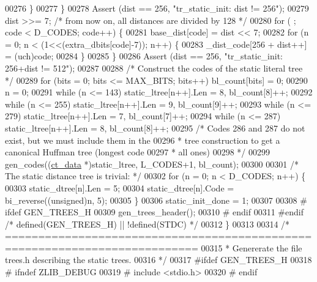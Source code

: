 \begin{DoxyCode}
{{00276         \}
00277     \}
00278     Assert (dist == 256, \textcolor{stringliteral}{"tr\_static\_init: dist != 256"});
00279     dist >>= 7; \textcolor{comment}{/* from now on, all distances are divided by 128 */}
00280     \textcolor{keywordflow}{for} ( ; code < D\_CODES; code++) \{
00281         base\_dist[code] = dist << 7;
00282         \textcolor{keywordflow}{for} (n = 0; n < (1<<(extra\_dbits[code]-7)); n++) \{
00283             \_dist\_code[256 + dist++] = (uch)code;
00284         \}
00285     \}
00286     Assert (dist == 256, \textcolor{stringliteral}{"tr\_static\_init: 256+dist != 512"});
00287 
00288     \textcolor{comment}{/* Construct the codes of the static literal tree */}
00289     \textcolor{keywordflow}{for} (bits = 0; bits <= MAX\_BITS; bits++) bl\_count[bits] = 0;
00290     n = 0;
00291     \textcolor{keywordflow}{while} (n <= 143) static\_ltree[n++].Len = 8, bl\_count[8]++;
00292     \textcolor{keywordflow}{while} (n <= 255) static\_ltree[n++].Len = 9, bl\_count[9]++;
00293     \textcolor{keywordflow}{while} (n <= 279) static\_ltree[n++].Len = 7, bl\_count[7]++;
00294     \textcolor{keywordflow}{while} (n <= 287) static\_ltree[n++].Len = 8, bl\_count[8]++;
00295     \textcolor{comment}{/* Codes 286 and 287 do not exist, but we must include them in the}
00296 \textcolor{comment}{     * tree construction to get a canonical Huffman tree (longest code}
00297 \textcolor{comment}{     * all ones)}
00298 \textcolor{comment}{     */}
00299     gen\_codes((\hyperlink{structct__data__s}{ct\_data} *)static\_ltree, L\_CODES+1, bl\_count);
00300 
00301     \textcolor{comment}{/* The static distance tree is trivial: */}
00302     \textcolor{keywordflow}{for} (n = 0; n < D\_CODES; n++) \{
00303         static\_dtree[n].Len = 5;
00304         static\_dtree[n].Code = bi\_reverse((\textcolor{keywordtype}{unsigned})n, 5);
00305     \}
00306     static\_init\_done = 1;
00307 
00308 \textcolor{preprocessor}{#  ifdef GEN\_TREES\_H}
00309     gen\_trees\_header();
00310 \textcolor{preprocessor}{#  endif}
00311 \textcolor{preprocessor}{#endif }\textcolor{comment}{/* defined(GEN\_TREES\_H) || !defined(STDC) */}\textcolor{preprocessor}{}
00312 \}
00313 
00314 \textcolor{comment}{/* ===========================================================================}
00315 \textcolor{comment}{ * Genererate the file trees.h describing the static trees.}
00316 \textcolor{comment}{ */}
00317 \textcolor{preprocessor}{#ifdef GEN\_TREES\_H}
00318 \textcolor{preprocessor}{#  ifndef ZLIB\_DEBUG}
00319 \textcolor{preprocessor}{#    include <stdio.h>}
00320 \textcolor{preprocessor}{#  endif}
}}
\end{DoxyCode}
